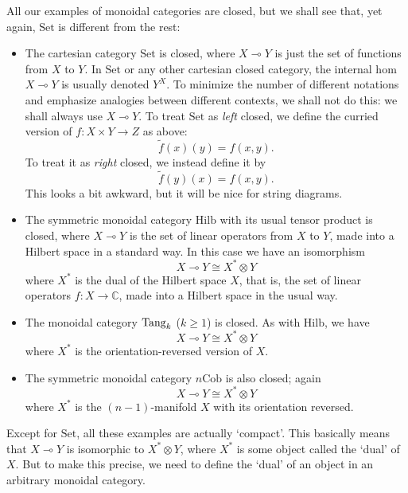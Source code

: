 \documentclass[12pt,twoside,openright]{report}
\newcommand{\Cob}{\mathrm{Cob}}
\newcommand{\Hilb}{\mathrm{Hilb}}
\newcommand{\Set}{\mathrm{Set}}
\newcommand{\Tang}{{\rm Tang}}
\newcommand{\maps}{\colon}
\newcommand{\iso}{\cong}
\newcommand{\lhom}{\multimap}
\newcommand{\tensor}{\otimes}
\begin{document}
All our examples of monoidal categories are closed, but we shall see that, yet again, $\Set$ is different from the rest:

\begin{itemize}
\item The cartesian category $\Set$ is closed, where 
$X \lhom Y$ is just the set of functions from $X$ to $Y$. In $\Set$ or any other cartesian closed category, the internal hom $X \lhom Y$ is usually denoted $Y^X$. To minimize the number of different notations and emphasize analogies between different contexts, we shall not do this:
we shall always use $X \lhom Y$.  To treat $\Set$ as {\it left}
closed, we define the curried version of $f \maps X \times Y \to Z$
as above:
\[        \tilde{f}(x)(y) = f(x,y)  .\]
To treat it as {\it right} closed, we instead define it by
\[        \tilde{f}(y)(x) = f(x,y)  .\]
This looks a bit awkward, but it will be nice for string diagrams.
\item The symmetric monoidal category $\Hilb$ with its usual tensor product is closed, where $X \lhom Y$ is the set of linear operators from $X$ to $Y$, made into a Hilbert space in a standard way.  In this case we have an isomorphism
\[        X \lhom Y \iso X^* \tensor Y \]
where $X^*$ is the dual of the Hilbert space $X$, that is, the set of linear operators $f \maps X \to \mathbb{C}$, made into a Hilbert space in the usual way.  
\item The monoidal category $\Tang_k$ ($k \ge 1$) is closed. As with $\Hilb$, we have
\[        X \lhom Y \iso X^* \tensor Y \]
where $X^*$ is the orientation-reversed version of $X$.
\item The symmetric monoidal category $n\Cob$ is also closed;
again
\[        X \lhom Y \iso X^* \tensor Y \]
where $X^*$ is the $(n-1)$-manifold $X$ with its orientation reversed.
\end{itemize}

Except for $\Set$, all these examples are actually `compact'.  This basically means that $X \lhom Y$ is isomorphic to $X^* \tensor Y$, where
$X^*$ is some object called the `dual' of $X$.  But to make this precise, we need to define the `dual' of an object in an arbitrary monoidal category.
\end{document}
